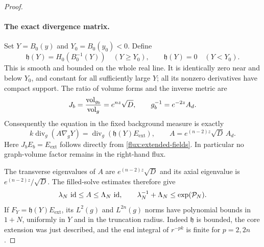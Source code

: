 \begin{proof}
\paragraph{The exact divergence matrix.}
Set $Y=B_0(y)$ and $Y_0=B_0(y_0)<0$.  Define
\begin{equation}
 \mathfrak h(Y)=H_0(B_0^{-1}(Y))\quad(Y\geq Y_0),\qquad
 \mathfrak h(Y)=0\quad(Y<Y_0).
 \label{flux:bounded-coefficient}
\end{equation}
This is smooth and bounded on the whole real line.  It is identically zero
near and below $Y_0$, and constant for all sufficiently large $Y$; all its
nonzero derivatives have compact support.  The ratio of volume forms and
the inverse metric are
\begin{equation}
 J_b=\frac{\operatorname{vol}_{g_b}}{\operatorname{vol}_g}=e^{nz}\sqrt D,
 \qquad g_b^{-1}=e^{-2z}A_d.
 \label{flux:volume-and-inverse}
\end{equation}
Consequently the equation in the fixed background measure is exactly
\begin{equation}
 k\operatorname{div}_g(A\nabla_gY)
   =\operatorname{div}_g(\mathfrak h(Y)E_{\mathrm{ext}}),
 \qquad A=e^{(n-2)z}\sqrt D\,A_d.
 \label{flux:background-equation}
\end{equation}
Here $J_bE_b=E_{\mathrm{ext}}$ follows directly from
\eqref{flux:extended-fields}.  In particular no graph-volume factor remains
in the right-hand flux.

The transverse eigenvalues of $A$ are $e^{(n-2)z}\sqrt D$ and its axial
eigenvalue is $e^{(n-2)z}/\sqrt D$.  The filled-solve estimates therefore give
\begin{equation}
 \lambda_N\,\operatorname{id}\leq A\leq\Lambda_N\,\operatorname{id},
 \qquad \lambda_N^{-1}+\Lambda_N\leq\exp(\mathcal P_N).
 \label{flux:ellipticity}
\end{equation}
If $F_Y=\mathfrak h(Y)E_{\mathrm{ext}}$, its $L^2(g)$ and $L^{2n}(g)$ norms have
polynomial bounds in $1+N$, uniformly in $Y$ and in the truncation radius.
Indeed $\mathfrak h$ is bounded, the core extension was just described, and the end
integral of $r^{-pk}$ is finite for $p=2,2n$.


\end{proof}
